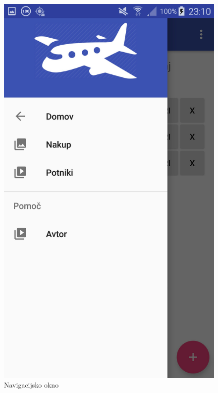 \documentclass[11pt,a4paper]{article}
\begin{document}
\begin{figure}[htb]
	\centerline{\includegraphics[width=1.0\textwidth]{GUI/navigation.jpg}}
	\caption{Navigacijsko okno}
	\label{sl:koncept}
\end{figure}
\end{document}
